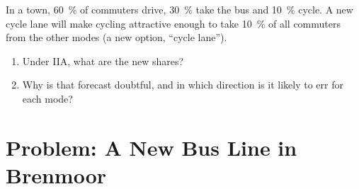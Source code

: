 \begin{exercise}[$\star\star\star$]\label{exo:b3:binary-outcomes:12}
In a town, 60~\% of commuters drive, 30~\% take the bus and 10~\% cycle. A new
cycle lane will make cycling attractive enough to take 10~\% of all commuters
from the other modes (a new option, ``cycle lane'').
\begin{enumerate}
\item Under IIA, what are the new shares?
\item Why is that forecast doubtful, and in which direction is it likely to err
for each mode?
\end{enumerate}
\end{exercise}

\section{Problem: A New Bus Line in Brenmoor}\label{sec:b3:binary-outcomes:problem}

